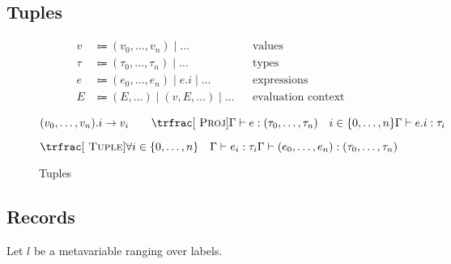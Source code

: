 \documentclass[nonacm]{acmart}
\begin{document}
\subsection{Tuples}

\begin{figure}
  \begin{framed}
    \begin{align*}
      v    & \Coloneqq (v_0, \dots, v_n) \mid \dots             &  & \text{values}             \\
      \tau & \Coloneqq (\tau_0, \dots, \tau_n) \mid \dots       &  & \text{types}              \\
      e    & \Coloneqq (e_0, \dots, e_n) \mid e.i \mid \dots    &  & \text{expressions}        \\
      E    & \Coloneqq (E, \dots) \mid (v, E, \dots) \mid \dots &  & \text{evaluation context}
    \end{align*}

    \[
      (v_0, \dots, v_n).i \rightarrow v_i
      \qquad
      \trfrac[~\textsc{Proj}]{\Gamma \vdash e : (\tau_0, \dots, \tau_n) \quad i \in \{0, \dots, n\}}{\Gamma \vdash e.i : \tau_i}
    \]

    \[
      \trfrac[~\textsc{Tuple}]{\forall i \in \{0, \dots, n\} \quad \Gamma \vdash e_i : \tau_i}{\Gamma \vdash (e_0, \dots, e_n) : (\tau_0, \dots, \tau_n)}
    \]
  \end{framed}
  \caption{Tuples}\label{fig:tuples}
\end{figure}

\subsection{Records}

Let \(l\) be a metavariable ranging over labels.
\end{document}
